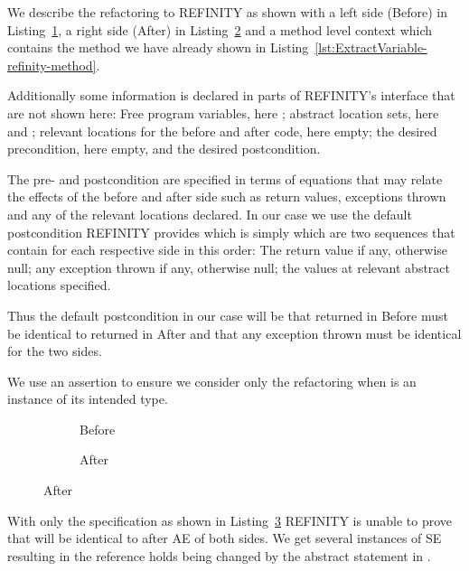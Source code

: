 We describe the refactoring to REFINITY as shown with a left side (Before) in Listing~\ref{lst:ExtractVariable-refinity-before},
a right side (After) in Listing~\ref{lst:ExtractVariable-refinity-after} and a method level context which contains the method we have already shown in Listing~\ref{lst:ExtractVariable-refinity-method}.

Additionally some information is declared in parts of REFINITY's interface that are not shown here:
Free program variables, here ; abstract location sets, here  and ; relevant locations for the before and after code, here empty;
the desired precondition, here empty, and the desired postcondition.

The pre- and postcondition are specified in terms of equations that may relate the effects of the before and after side such as return values, exceptions thrown and any of the relevant locations declared.
In our case we use the default postcondition REFINITY provides which is simply  which are two sequences that contain for each respective side in this order:
The return value if any, otherwise null; any exception thrown if any, otherwise null; the values at relevant abstract locations specified.

Thus the default postcondition in our case will be that  returned in Before must be identical to  returned in After and that any exception thrown must be identical for the two sides.

We use an assertion to ensure we consider only the refactoring when  is an instance of its intended type.
\begin{figure}[!h]
  \centering
  \begin{subfigure}[b]{.34\linewidth}
    
    \vspace{-2mm}
    \caption{Before}
    \label{lst:ExtractVariable-refinity-before}
  \end{subfigure}\hspace{1cm}
  \begin{subfigure}[b]{.34\linewidth}
    
    \vspace{-2mm}
    \caption{After}
    \label{lst:ExtractVariable-refinity-after}
  \end{subfigure}\vspace{4mm}
\label{lst:ExtractVariable-refinity}
\end{figure}
With only the specification as shown in Listing~\ref{lst:ExtractVariable-refinity} REFINITY is unable to prove that  will be identical to  after AE of both sides.
We get several instances of SE resulting in the reference  holds being changed by the abstract statement  in .


